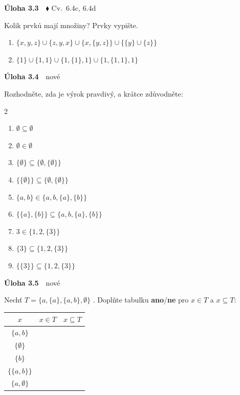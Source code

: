 \documentclass[11pt,a4paper]{article}
\newcommand{\Ano}{\textbf{ano}\xspace}\newcommand{\Ne}{\textbf{ne}\xspace}
\newenvironment{pol}{\begin{enumerate}[label=(\alph*),leftmargin=2em,itemsep=3pt]}{\end{enumerate}}
\newenvironment{dvasl}{\begin{multicols}{2}\begin{enumerate}[label=(\alph*),leftmargin=2em,itemsep=3pt]}{\end{enumerate}\end{multicols}}
\newenvironment{uloha}[2]{\Needspace{6\baselineskip}\par\vspace{6pt}\noindent\textbf{Úloha #1}\ \ {\footnotesize\color{gray}#2}\par\vspace{2pt}}{\par\vspace{4pt}}
\begin{document}
\begin{uloha}{3.3}{$\blacklozenge$ Cv.~6.4c, 6.4d}
Kolik prvků mají množiny? Prvky vypište.
\begin{pol}
  \item $\{x,y,z\}\cup\{z,y,x\}\cup\{x,\{y,z\}\}\cup\{\{y\}\cup\{z\}\}$
  \item $\{1\}\cup\{1,1\}\cup\{1,\{1\},1\}\cup\{1,\{1,1\},1\}$
\end{pol}

\end{uloha}

\begin{uloha}{3.4}{nové}
Rozhodněte, zda je výrok pravdivý, a krátce zdůvodněte:
\begin{dvasl}
  \item $\emptyset\subseteq\emptyset$
  \item $\emptyset\in\emptyset$
  \item $\{\emptyset\}\subseteq\{\emptyset,\{\emptyset\}\}$
  \item $\{\{\emptyset\}\}\subseteq\{\emptyset,\{\emptyset\}\}$
  \item $\{a,b\}\in\{a,b,\{a\},\{b\}\}$
  \item $\{\{a\},\{b\}\}\subseteq\{a,b,\{a\},\{b\}\}$
  \item $3\in\{1,2,\{3\}\}$
  \item $\{3\}\subseteq\{1,2,\{3\}\}$
  \item $\{\{3\}\}\subseteq\{1,2,\{3\}\}$
\end{dvasl}

\end{uloha}

\begin{uloha}{3.5}{nové}
Nechť $T=\{a,\{a\},\{a,b\},\emptyset\}$ . Doplňte tabulku \Ano/\Ne{} pro $x\in T$ a $x\subseteq T$:
\begin{center}
\renewcommand{\arraystretch}{1.9}
\begin{tabular}{|c|c|c|}
\hline
$x$ & $x\in T$ & $x\subseteq T$\\\hline
$\{a,b\}$ & \hspace{1.6cm} & \hspace{1.6cm}\\\hline
$\{\emptyset\}$ & & \\\hline
$\{b\}$ & & \\\hline
$\{\{a,b\}\}$ & & \\\hline
$\{a,\emptyset\}$ & & \\\hline
\end{tabular}
\end{center}
\end{uloha}
\end{document}
